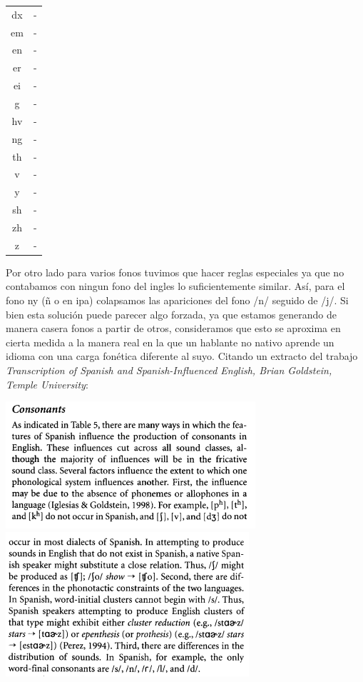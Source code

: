 \begin{table}
\begin{minipage}[t]{0.3\textwidth}
\begin{tabular}[t]{c|c}
dx & -\\  
em & -\\  
en & -\\  
er & -\\  
ei & -\\  
g & -\\  
hv & -\\  
ng & -\\  
th & -\\  
v & -\\  
y & -\\  
sh & -\\  
zh & -\\  
z  & -\\  
\bottomrule
\end{tabular}
\end{minipage}
\end{table}

Por otro lado para varios fonos tuvimos que hacer reglas especiales ya que no contabamos con ningun fono del ingles lo suficientemente similar. Así,  para el fono ny (ñ o \textltailn en ipa) colapsamos las apariciones del fono /n/ seguido de /j/. Si bien esta solución puede parecer algo forzada, ya que estamos generando de manera casera fonos a partir de otros, consideramos que esto se aproxima en cierta medida a la manera real en la que un hablante no nativo aprende un idioma con una carga fonética diferente al suyo. Citando un extracto del trabajo \textit{Transcription of Spanish and Spanish-Influenced English, Brian Goldstein, Temple University}:

\begin{center}
\includegraphics[scale=0.5]{imagenes_investigacion/consonantes1.png}
\includegraphics[scale=0.5]{imagenes_investigacion/consonantes2.png}
\end{center}

